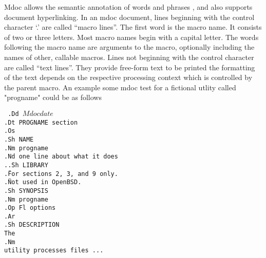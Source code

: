 \documentclass{report}
\begin{document}
Mdoc allows the semantic annotation of words and phrases , and also supports document hyperlinking.
In an mdoc document, lines beginning with the control character ‘.’ are called “macro lines”.
The first word is the macro name. It consists of two or three letters. Most macro names begin with a capital letter. The words following the macro name are arguments to the macro, 
optionally including the names of other, callable macros.
Lines not beginning with the control character are called “text lines”. They provide free-form text to be printed
the formatting of the text depends on the respective processing context which is controlled by the parent macro.
An example some mdoc test for a fictional utlity called "progname" could be as follows
\begin{center}

{\tt \small
.Dd $Mdocdate$ \\
.Dt PROGNAME section \\
.Os \\
.Sh NAME \\
.Nm progname \\
.Nd one line about what it does \\
.\" .Sh LIBRARY \\
.\" For sections 2, 3, and 9 only. \\
.\" Not used in OpenBSD. \\
.Sh SYNOPSIS \\
.Nm progname \\
.Op Fl options \\
.Ar \\
.Sh DESCRIPTION \\
The \\
.Nm \\
utility processes files ... \\
}
\end{center}
\end{document}
